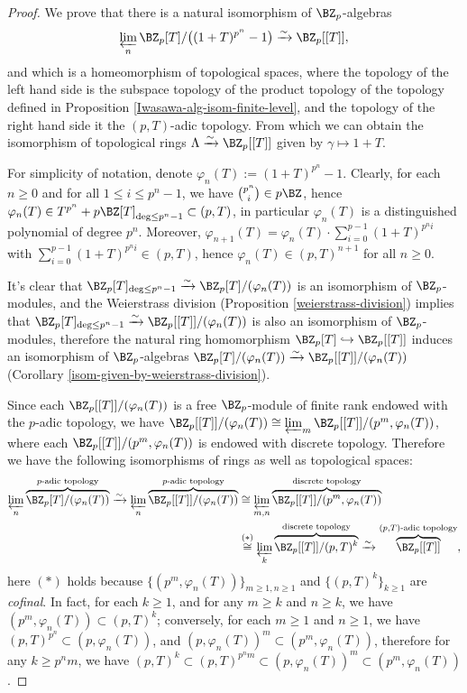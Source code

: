 \begin{proof}
We prove that there is a natural isomorphism of $\BZ_p$-algebras
$$
\varprojlim_n\BZ_p[T]/\big((1+T)^{p^n}-1\big)
\xrightarrow\sim\BZ_p[[T]],
$$
and which is a homeomorphism of topological spaces,
where the topology of the left hand side is the subspace topology
of the product topology of the topology defined in Proposition
\ref{Iwasawa-alg-isom-finite-level},
and the topology of the right hand side it the $(p,T)$-adic topology.
From which we can obtain the isomorphism of topological rings
$\Lambda\xrightarrow\sim\BZ_p[[T]]$ given by $\gamma\mapsto 1+T$.

For simplicity of notation, denote $\varphi_n(T):=(1+T)^{p^n}-1$.
Clearly, for each $n\geq 0$ and for all $1\leq i\leq p^n-1$,
we have $\binom{p^n}{i}\in p\BZ$,
hence $\varphi_n(T)\in T^{p^n}+p\BZ[T]_{\deg\leq p^n-1}\subset(p,T)$,
in particular $\varphi_n(T)$ is a distinguished polynomial of degree $p^n$.
Moreover, $\varphi_{n+1}(T)=\varphi_n(T)\cdot\sum_{i=0}^{p-1}(1+T)^{p^ni}$
with $\sum_{i=0}^{p-1}(1+T)^{p^ni}\in(p,T)$,
hence $\varphi_n(T)\in(p,T)^{n+1}$ for all $n\geq 0$.

It's clear that $\BZ_p[T]_{\deg\leq p^n-1}\xrightarrow\sim\BZ_p[T]/(\varphi_n(T))$
is an isomorphism of $\BZ_p$-modules,
and the Weierstrass division (Proposition \ref{weierstrass-division}) implies that
$\BZ_p[T]_{\deg\leq p^n-1}\xrightarrow\sim\BZ_p[[T]]/(\varphi_n(T))$
is also an isomorphism of $\BZ_p$-modules,
therefore the natural ring homomorphism $\BZ_p[T]\hookrightarrow\BZ_p[[T]]$
induces an isomorphism of $\BZ_p$-algebras
$\BZ_p[T]/(\varphi_n(T))\xrightarrow\sim\BZ_p[[T]]/(\varphi_n(T))$
(Corollary \ref{isom-given-by-weierstrass-division}).

Since each $\BZ_p[[T]]/(\varphi_n(T))$ is a free $\BZ_p$-module of finite rank
endowed with the $p$-adic topology, we have
$\BZ_p[[T]]/(\varphi_n(T))\cong\varprojlim_m\BZ_p[[T]]/(p^m,\varphi_n(T))$,
where each $\BZ_p[[T]]/(p^m,\varphi_n(T))$ is endowed with discrete topology.
Therefore we have the following isomorphisms of rings as well as topological spaces:
\begin{align*}
\varprojlim_n\overbrace{\BZ_p[T]/(\varphi_n(T))}^{p\text{-adic topology}}
\xrightarrow\sim
\varprojlim_n\overbrace{\BZ_p[[T]]/(\varphi_n(T))}^{p\text{-adic topology}}
&\cong
\varprojlim_{m,n}\overbrace{\BZ_p[[T]]/(p^m,\varphi_n(T))}^{\text{discrete topology}} \\
&\stackrel{(*)}\cong
\varprojlim_k\overbrace{\BZ_p[[T]]/(p,T)^k}^{\text{discrete topology}}
\xrightarrow\sim
\overbrace{\BZ_p[[T]]}^{(p,T)\text{-adic topology}},
\end{align*}
here $(*)$ holds because $\{(p^m,\varphi_n(T))\}_{m\geq 1,n\geq 1}$
and $\{(p,T)^k\}_{k\geq 1}$ are \emph{cofinal}.
In fact, for each $k\geq 1$, and for any $m\geq k$ and $n\geq k$,
we have $(p^m,\varphi_n(T))\subset(p,T)^k$;
conversely, for each $m\geq 1$ and $n\geq 1$,
we have $(p,T)^{p^n}\subset(p,\varphi_n(T))$,
and $(p,\varphi_n(T))^m\subset(p^m,\varphi_n(T))$,
therefore for any $k\geq p^nm$, we have
$(p,T)^k\subset(p,T)^{p^nm}\subset(p,\varphi_n(T))^m\subset(p^m,\varphi_n(T))$.
\end{proof}


